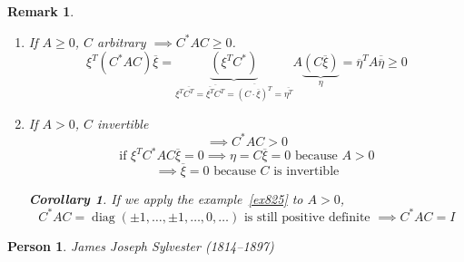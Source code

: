 \documentclass[a4paper]{article}
\newcounter{lecref}[section]
\numberwithin{lecref}{section}
\newtheorem{remark}[lecref]{Remark}
\newtheorem{corollary}[lecref]{Corollary}
\newtheorem*{Person}{Person}
\begin{document}
\begin{remark} %
  \begin{enumerate}
    \item If $A \geq 0$, $C$ arbitrary $\implies C^* AC \geq 0$.
      \[ \xi^T (C^* AC) \overline{\xi} = \underbrace{(\xi^T C^*)}_{\xi^T \overline{C^T} = \overline{\overline{\xi^T} C^T} = \overline{(C \cdot \overline{\xi})^T} = \overline{\eta^T}} A \underbrace{(C \overline{\xi})}_{\eta}
         = \overline{\eta}^T A \overline{\overline{\eta}} \geq 0
      \]
    \item If $A > 0$, $C$ invertible
      \[ \implies C^* AC > 0 \]
      \[ \text{if } \xi^T C^* AC \overline{\xi} = 0 \implies  \eta = C \overline{\xi} = 0 \text{ because } A > 0 \]
      \[ \implies \overline{\xi} = 0 \text{ because } C \text{ is invertible} \]

      \begin{corollary}
        If we apply the example~\ref{ex825} to $A>0$,
        \[
          C^* AC = 
          \operatorname{diag}(\pm 1, \dots, \pm 1, \dots, 0, \dots)
          \text{ is still positive definite }
          \implies C^* AC = I
        \]
      \end{corollary}
  \end{enumerate}
\end{remark}

\begin{Person}
  James Joseph Sylvester (1814--1897)
\end{Person}
\end{document}

